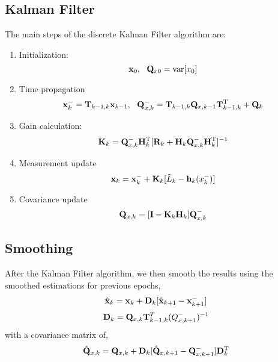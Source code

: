 \subsection{Kalman Filter} %
\label{sub:kalman_filter}
The main steps of the discrete Kalman Filter algorithm are:
\begin{enumerate}
	\item Initialization:
	\begin{equation}
		\mathbf{x}_0,~~\mathbf{Q}_{x0} = \mathrm{var}[x_0]
		\label{eq:eq15}
	\end{equation} %
	\item Time propagation
	\begin{equation}
		\mathbf{x}_k^- = \mathbf{T}_{k-1,k}\mathbf{x}_{k-1},~~\mathbf{Q}_{x,k}^-= \mathbf{T}_{k-1,k}\mathbf{Q}_{x,k-1}\mathbf{T}_{k-1,k}^{\mathrm{T}} + \mathbf{Q}_k
		\label{eq:eq16}
	\end{equation} %
	\item Gain calculation:
	\begin{equation}
		\mathbf{K}_k = \mathbf{Q}_{x,k}^-\mathbf{H}_k^{\mathrm{T}}[\mathbf{R}_k+\mathbf{H}_k \mathbf{Q}_{x,k}^-\mathbf{H}_k^{\mathrm{T}}]^{-1}
		\label{eq:eq17}
	\end{equation} %
	\item Measurement update
	\begin{equation}
		\mathbf{x}_k = \mathbf{x}_k^-+\mathbf{K}_k[\tilde{L}_k-\mathbf{h}_k(x_k^-)]
		\label{eq:eq18}
	\end{equation} %
	\item Covariance update
	\begin{equation}
		\mathbf{Q}_{x,k} = [\mathbf{I}-\mathbf{K}_k \mathbf{H}_k]\mathbf{Q}_{x,k}^-
		\label{eq:19}
	\end{equation} %
\end{enumerate}
\subsection{Smoothing} %
\label{sub:smoothing}
After the Kalman Filter algorithm, we then smooth the results using the smoothed estimations for previous epochs,
\begin{equation}
	\hat{\mathbf{x}}_k = \mathbf{x}_k + \mathbf{D}_k [\hat{\mathbf{x}}_{k+1} - \mathbf{x}_{k+1}^-]
	\label{eq:eq28}
\end{equation} %
\begin{equation}
	\mathbf{D}_k = \mathbf{Q}_{x,k}\mathbf{T}_{k-1,k}^{T}(Q_{x,k+1}^-)^{-1}
	\label{eq:eq29}
\end{equation} %
with a covariance matrix of,
\begin{equation}
	\hat{\mathbf{Q}}_{x,k} = \mathbf{Q}_{x,k}+\mathbf{D}_{k}[\hat{\mathbf{Q}}_{x,k+1}-\mathbf{Q}_{x,k+1}^-]\mathbf{D}_k^{\mathrm{T}}
	\label{eq:eq30}
\end{equation} %
